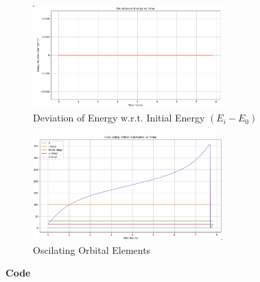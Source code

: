 \begin{hwkProblem}{3}{}
	\hwkPart

	\begin{figure}[H]
		\begin{center}
			\includegraphics[width=0.65\textwidth]{./images/s03e.png}
		\end{center}
		\caption{Deviation of Energy w.r.t. Initial Energy \( \left( E_{i} - E_{0} \right)  \)}\label{fig:s03e}
	\end{figure}

	\hwkPart

	\begin{figure}[H]
		\begin{center}
			\includegraphics[width=0.65\textwidth]{./images/s03f.png}
		\end{center}
		\caption{Oscilating Orbital Elements}\label{fig:s03f}
	\end{figure}

	\vspace{\baselineskip / 2}
	\textbf{\large Code}
	\vspace{\baselineskip / 2}

	

\end{hwkProblem}

